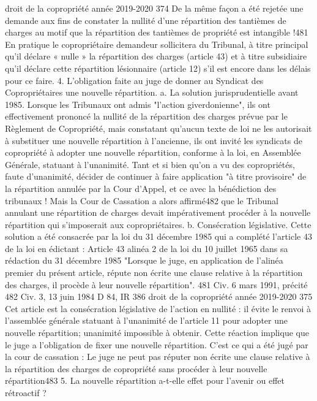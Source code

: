 droit de la copropriété année 2019-2020
374
De la même façon a été rejetée une demande aux fins de constater la nullité d'une répartition des tantièmes de charges au motif que la répartition des tantièmes de propriété est intangible !481
En pratique le copropriétaire demandeur sollicitera du Tribunal, à titre principal qu'il déclare « nulle » la répartition des charges (article 43) et à titre subsidiaire qu'il déclare cette répartition lésionnaire (article 12) s’il est encore dans les délais pour ce faire.
4. L’obligation faite au juge de donner au Syndicat des Copropriétaires une nouvelle répartition.
a. La solution jurisprudentielle avant 1985.
Lorsque les Tribunaux ont admis "l'action giverdonienne", ils ont effectivement prononcé la nullité de la répartition des charges prévue par le Règlement de Copropriété, mais constatant qu'aucun texte de loi ne les autorisait à substituer une nouvelle répartition à l'ancienne, ils ont invité les syndicats de copropriété à adopter une nouvelle répartition, conforme à la loi, en Assemblée Générale, statuant à l'unanimité.
Tant et si bien qu'on a vu des copropriétés, faute d'unanimité, décider de continuer à faire application "à titre provisoire" de la répartition annulée par la Cour d'Appel, et ce avec la bénédiction des tribunaux !
Mais la Cour de Cassation a alors affirmé482 que le Tribunal annulant une répartition de charges devait impérativement procéder à la nouvelle répartition qui s'imposerait aux copropriétaires.
b. Consécration législative.
Cette solution a été consacrée par la loi du 31 décembre 1985 qui a complété l'article 43 de la loi en édictant :
Article 43 alinéa 2 de la loi du 10 juillet 1965 dans sa rédaction du 31 décembre 1985
"Lorsque le juge, en application de l'alinéa premier du présent article, répute non écrite une clause relative à la répartition des charges, il procède à leur nouvelle répartition".
481 Civ. 6 mars 1991, précité
482 Civ. 3\degres, 13 juin 1984 D 84, IR 386
droit de la copropriété année 2019-2020
375
Cet article est la consécration législative de l'action en nullité : il évite le renvoi à l'assemblée générale statuant à l'unanimité de l'article 11 pour adopter une nouvelle répartition; unanimité impossible à obtenir.
Cette réaction implique que le juge a l’obligation de fixer une nouvelle répartition. C’est ce qui a été jugé par la cour de cassation : Le juge ne peut pas réputer non écrite une clause relative à la répartition des charges de copropriété sans procéder à leur nouvelle répartition483
5. La nouvelle répartition a-t-elle effet pour l’avenir ou effet rétroactif ?
